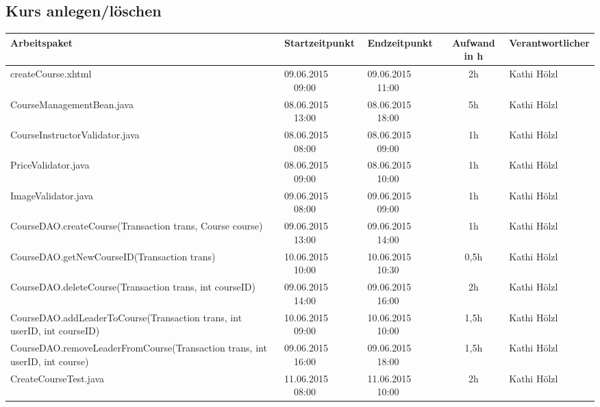 \begin{landscape}
	
	
	\subsection{Kurs anlegen/löschen}
	\begin{tabular}{|p{10.3cm}|p{3.2cm}|p{3.2cm}|c|p{3.5cm}|}
		\hline  \textbf{Arbeitspaket} & \textbf{Startzeitpunkt} & \textbf{Endzeitpunkt} & \textbf{Aufwand in h} & \textbf{Verantwortlicher} \\ 
		\hline   createCourse.xhtml                                    & 09.06.2015 \ \ 09:00     & 09.06.2015 \ \ 11:00     &      2h               & Kathi Hölzl\\
		\hline   CourseManagementBean.java                             & 08.06.2015 \ \ 13:00     & 08.06.2015 \ \ 18:00     &      5h               & Kathi Hölzl\\
		\hline   CourseInstructorValidator.java                        & 08.06.2015 \ \ 08:00     & 08.06.2015 \ \ 09:00     &      1h               & Kathi Hölzl\\
		\hline   PriceValidator.java                                   & 08.06.2015 \ \ 09:00     & 08.06.2015 \ \ 10:00     &      1h               & Kathi Hölzl\\
		\hline   ImageValidator.java                                   & 09.06.2015 \ \ 08:00     & 09.06.2015 \ \ 09:00     &      1h               & Kathi Hölzl\\
		\hline   CourseDAO.createCourse(Transaction trans, Course course)    & 09.06.2015 \ \ 13:00     & 09.06.2015 \ \ 14:00     &      1h               & Kathi Hölzl\\
		\hline   CourseDAO.getNewCourseID(Transaction trans)                 & 10.06.2015 \ \ 10:00     & 10.06.2015 \ \ 10:30     &      0,5h             & Kathi Hölzl\\
		\hline   CourseDAO.deleteCourse(Transaction trans, int courseID)     & 09.06.2015 \ \ 14:00     & 09.06.2015 \ \ 16:00     &      2h               & Kathi Hölzl\\
		\hline   CourseDAO.addLeaderToCourse(Transaction trans, int userID, int courseID)    & 10.06.2015 \ \ 09:00     & 10.06.2015 \ \ 10:00     &   1,5h  & Kathi Hölzl\\
		\hline   CourseDAO.removeLeaderFromCourse(Transaction trans, int userID, int course) & 09.06.2015 \ \ 16:00     & 09.06.2015 \ \ 18:00     &   1,5h  & Kathi Hölzl\\
		\hline   CreateCourseTest.java                                & 11.06.2015 \ \ 08:00     & 11.06.2015 \ \ 10:00     &      2h               & Kathi Hölzl\\
		\hline 
	\end{tabular} \ \\
	\ \\
	

\end{landscape}
